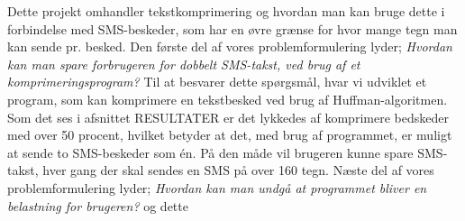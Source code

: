 Dette projekt omhandler tekstkomprimering og hvordan man kan bruge dette i forbindelse med SMS-beskeder, som har en øvre grænse for hvor mange tegn man kan sende pr. besked. Den første del af vores problemformulering lyder;
\emph{Hvordan kan man spare forbrugeren for dobbelt SMS-takst, ved brug af et komprimeringsprogram?}
Til at besvarer dette spørgsmål, hvar vi udviklet et program, som kan komprimere en tekstbesked ved brug af Huffman-algoritmen. Som det ses i afsnittet RESULTATER er det lykkedes af komprimere bedskeder med over 50 procent, hvilket betyder at det, med brug af programmet, er muligt at sende to SMS-beskeder som én. På den måde vil brugeren kunne spare SMS-takst, hver gang der skal sendes en SMS på over 160 tegn. 
Næste del af vores problemformulering lyder;
\emph{Hvordan kan man undgå at programmet bliver en belastning for brugeren?} og dette 

